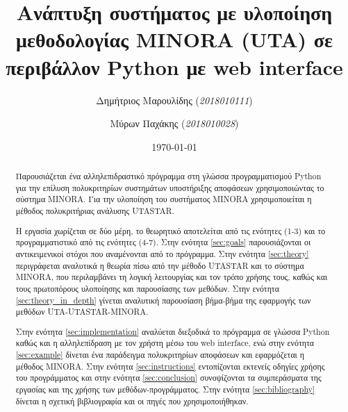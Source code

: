 \documentclass[11pt,a4paper,titlepage]{article}
\author{Δημήτριος Μαρουλίδης (\textit{2018010111}) \and
    Μύρων Παχάκης (\textit{2018010028})}
\title{Ανάπτυξη συστήματος με υλοποίηση μεθοδολογίας MINORA (UTA) σε περιβάλλον Python με web interface}
\date{\today}
\numberwithin{equation}{section}
\begin{document}
\maketitle	
\tableofcontents

\clearpage

\begin{abstract}
Παρουσιάζεται ένα αλληλεπιδραστικό πρόγραμμα στη γλώσσα προγραμματισμού Python για την επίλυση πολυκριτηρίων συστημάτων υποστήριξης αποφάσεων χρησιμοποιώντας το σύστημα MINORA. Για την υλοποίηση του συστήματος MINORA χρησιμοποιείται η μέθοδος πολυκριτήριας ανάλυσης UTASTAR.

Η εργασία χωρίζεται σε δύο μέρη, το θεωρητικό αποτελείται από τις ενότητες (1-3) και το προγραμματιστικό από τις ενότητες (4-7). Στην ενότητα \ref{sec:goals} παρουσιάζονται οι αντικειμενικοί στόχοι που αναμένονται από το πρόγραμμα. Στην ενότητα \ref{sec:theory} περιγράφεται αναλυτικά η θεωρία πίσω από την μέθοδο UTASTAR και το σύστημα MINORA, που περιλαμβάνει τη λογική λειτουργίας και τον τρόπο χρήσης τους, καθώς και τους πρωτοπόρους υλοποίησης και παρουσίασης των μεθόδων. Στην ενότητα \ref{sec:theory_in_depth} γίνεται αναλυτική παρουσίαση βήμα-βήμα της εφαρμογής των μεθόδων UTA-UTASTAR-MINORA.

Στην ενότητα \ref{sec:implementation} αναλύεται διεξοδικά το πρόγραμμα σε γλώσσα Python καθώς και η αλληλεπίδραση με τον χρήστη μέσω του web interface, ενώ στην ενότητα \ref{sec:example} δίνεται ένα παράδειγμα πολυκριτηρίων αποφάσεων και εφαρμόζεται η μέθοδος MINORA. Στην ενότητα \ref{sec:instructions} εντοπίζονται εκτενείς οδηγίες χρήσης του προγράμματος και στην ενότητα \ref{sec:conclusion} συνοψίζονται τα συμπεράσματα της εργασίας και της χρήσης των μεθόδων-προγράμματος. Στην ενότητα \ref{sec:bibliography} δίνεται η σχετική βιβλιογραφία και οι πηγές που χρησιμοποιήθηκαν.
\end{abstract}
\end{document}
